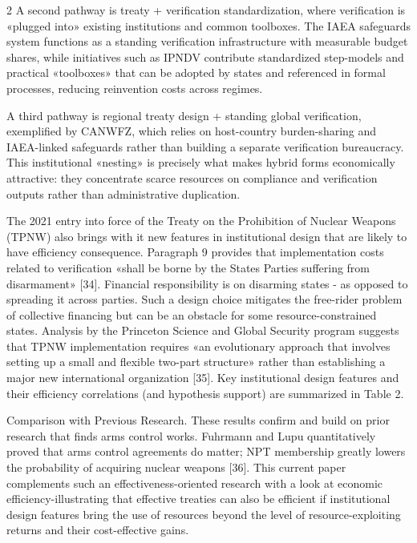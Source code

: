 \begin{multicols}{2}
A second pathway is treaty + verification standardization, where
verification is «plugged into» existing institutions and common
toolboxes. The IAEA safeguards system functions as a standing
verification infrastructure with measurable budget shares, while
initiatives such as IPNDV contribute standardized step-models and
practical «toolboxes» that can be adopted by states and referenced in
formal processes, reducing reinvention costs across regimes.

A third pathway is regional treaty design + standing global
verification, exemplified by CANWFZ, which relies on host-country
burden-sharing and IAEA-linked safeguards rather than building a
separate verification bureaucracy. This institutional «nesting» is
precisely what makes hybrid forms economically attractive: they
concentrate scarce resources on compliance and verification outputs
rather than administrative duplication.

The 2021 entry into force of the Treaty on the Prohibition of Nuclear
Weapons (TPNW) also brings with it new features in institutional design
that are likely to have efficiency consequence. Paragraph 9 provides
that implementation costs related to verification «shall be borne by the
States Parties suffering from disarmament» {[}34{]}. Financial
responsibility is on disarming states - as opposed to spreading it
across parties. Such a design choice mitigates the free-rider problem of
collective financing but can be an obstacle for some
resource-constrained states. Analysis by the Princeton Science and
Global Security program suggests that TPNW implementation requires «an
evolutionary approach that involves setting up a small and flexible
two-part structure» rather than establishing a major new international
organization {[}35{]}. Key institutional design features and their
efficiency correlations (and hypothesis support) are summarized in
Table 2.

Comparison with Previous Research. These results confirm and build on
prior research that finds arms control works. Fuhrmann and Lupu
quantitatively proved that arms control agreements do matter; NPT
membership greatly lowers the probability of acquiring nuclear weapons
{[}36{]}. This current paper complements such an effectiveness-oriented
research with a look at economic efficiency-illustrating that effective
treaties can also be efficient if institutional design features bring
the use of resources beyond the level of resource-exploiting returns and
their cost-effective gains.
\end{multicols}


